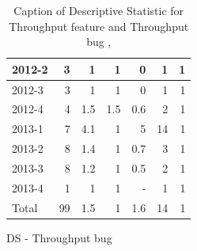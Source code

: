 \documentclass[UKenglish]{ifimaster}  %
\begin{document}
\begin{appendices}
\begin{table}[!htbp]
\begin{adjustwidth}{-1.5cm}{}
\begin{subfigure}[b]{0.3\textwidth}
{\begin{tabular}{ | l | r | r | r | r | r | r | }
 2012-2  & 3 & 1 & 1 & 0 &1 & 1 \\ \hline
 2012-3  & 3 & 1 & 1 & 0 &1 & 1 \\ \hline
 2012-4  & 4 & 1.5 & 1.5 & 0.6 & 2 & 1 \\ \hline
 2013-1  & 7 & 4.1 & 1 & 5 & 14 & 1 \\ \hline
 2013-2  & 8 & 1.4 & 1 & 0.7 & 3 & 1 \\ \hline
 2013-3  & 8 & 1.2 & 1 & 0.5 & 2 & 1 \\ \hline
 2013-4  & 1 & 1 & 1 & - & 1 & 1 \\ \hline
 Total  & 99 & 1.5 & 1 & 1.6 & 14 & 1 \\ \hline
\end{tabular}
}
\caption{DS - Throughput bug}
 \label{DS:TPB:8}
\end{subfigure}
\end{adjustwidth}
\caption[Optional caption for list of figures]{Caption of Descriptive Statistic for Throughput feature and Throughput bug  , }
\label{DS:8:2}
\end{table}




\end{appendices}
\end{document}
